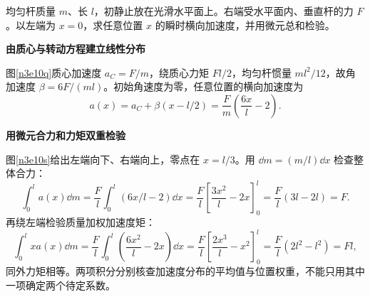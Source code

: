 \begin{question}\begin{example}[均匀杆的连续加速度分布]\label{n3e10}
均匀杆质量 $m$、长 $l$，初静止放在光滑水平面上。右端受水平面内、垂直杆的力 $F$。以左端为 $x=0$，求任意位置 $x$ 的瞬时横向加速度，并用微元总和检验。
\end{example}\end{question}
\begin{solution}\textbf{由质心与转动方程建立线性分布}\par\nobreak
图\ref{n3e10q}质心加速度 $a_C=F/m$，绕质心力矩 $Fl/2$，均匀杆惯量 $ml^2/12$，故角加速度 $\beta=6F/(ml)$。初始角速度为零，任意位置的横向加速度为
\[a(x)=a_C+\beta(x-l/2)=\frac Fm\left(\frac{6x}{l}-2\right).\]


\par\medskip{}\noindent\textbf{用微元合力和力矩双重检验}\par\nobreak
图\ref{n3e10s}给出左端向下、右端向上，零点在 $x=l/3$。用 $\dd m=(m/l)\dd x$ 检查整体合力：
\[
\int_0^la(x)\dd m=\frac Fl\int_0^l(6x/l-2)\dd x
=\frac Fl\left[\frac{3x^2}{l}-2x\right]_0^l
=\frac Fl(3l-2l)=F.
\]
再绕左端检验质量加权加速度矩：
\[
\int_0^l xa(x)\dd m
=\frac Fl\int_0^l\left(\frac{6x^2}{l}-2x\right)\dd x
=\frac Fl\left[\frac{2x^3}{l}-x^2\right]_0^l
=\frac Fl(2l^2-l^2)=Fl,
\]
同外力矩相等。两项积分分别核查加速度分布的平均值与位置权重，不能只用其中一项确定两个待定系数。
\end{solution}

